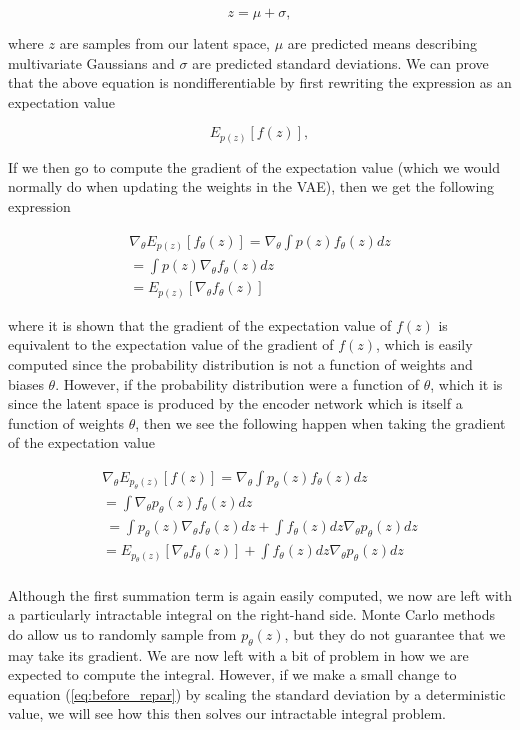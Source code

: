 \begin{equation}
    z = \mu + \sigma,\label{eq:before_repar} 
\end{equation}

where $z$ are samples from our latent space, $\mu$ are predicted means 
describing multivariate Gaussians and $\sigma$ are predicted standard deviations. 
We can prove that the above equation is nondifferentiable by first rewriting 
the expression as an expectation value

\begin{equation}
    E_{p(z)}[f(z)],
\end{equation}

If we then go to compute the gradient of the expectation value 
(which we would normally do when updating the weights in the 
\ac{VAE}), then we get the following expression

\begin{align}
    \nabla_{\theta} E_{p(z)}[f_{\theta}(z)] = \nabla_{\theta} \int p(z) f_{\theta}(z) dz\\ 
    = \int p(z) \nabla_{\theta} f_{\theta}(z) dz\\
    = E_{p(z)}[\nabla_{\theta} f_{\theta}(z)]
\end{align}

where it is shown that the gradient of the expectation value 
of $f(z)$ is equivalent to the expectation value of the gradient 
of $f(z)$, which is easily computed since the probability distribution 
is not a function of weights and biases $\theta$. However, if the probability distribution 
were a function of $\theta$, which it is since the latent space is produced 
by the encoder network which is itself a function of weights $\theta$, then 
we see the following happen when taking the gradient of the 
expectation value

\begin{align}
    \nabla_{\theta} E_{p_{\theta}(z)}[f(z)] = \nabla_{\theta} \int p_{\theta}(z) f_{\theta}(z) dz\\
     = \int \nabla_{\theta}  p_{\theta}(z) f_{\theta}(z) dz\\\
     = \int  p_{\theta}(z) \nabla_{\theta} f_{\theta}(z) dz + \int  f_{\theta}(z) dz \nabla_{\theta} p_{\theta}(z) dz\\
     = E_{p_{\theta}(z)}[ \nabla_{\theta} f_{\theta}(z)] + \int  f_{\theta}(z) dz \nabla_{\theta} p_{\theta}(z) dz\\
\end{align}

Although the first summation term is again easily computed, we now are 
left with a particularly intractable integral on the right-hand side.
Monte Carlo methods do allow us to randomly sample from $p_{\theta}(z)$, but 
they do not guarantee that we may take its gradient. 
We are now left with a bit of problem in how we are expected to compute the integral.
However, if we make a small change to equation (\ref{eq:before_repar}) 
by scaling the standard deviation by a deterministic value, we will 
see how this then solves our intractable integral problem. 

